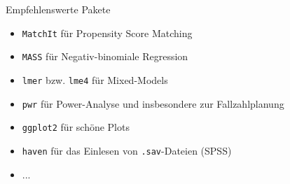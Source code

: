 \documentclass[aspectratio = 169]{chariteBeamer}
\begin{document}
\begin{frame}[fragile]{Empfehlenswerte Pakete}
	\begin{itemize}
		\item \verb+MatchIt+ für Propensity Score Matching 
	          \item \verb+MASS+ für Negativ-binomiale Regression \\
	          \item \verb+lmer+ bzw. \verb+lme4+ für Mixed-Models \\
	          \item \verb+pwr+ für Power-Analyse und insbesondere zur Fallzahlplanung \\
	          \item \verb+ggplot2+ für schöne Plots \\
	          \item \verb+haven+ für das Einlesen von \verb+.sav+-Dateien (SPSS) \\ 
	          \item ...
	\end{itemize}
\end{frame}
	
\end{document}
